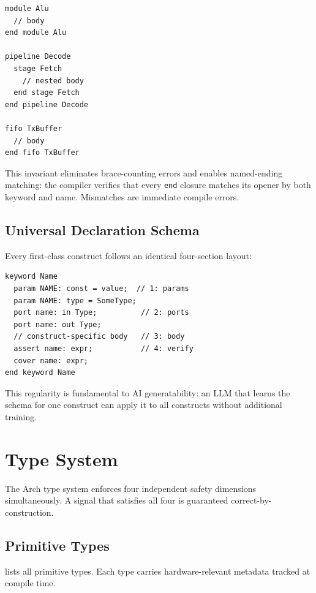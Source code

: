 \documentclass[11pt,twocolumn]{article}
\begin{document}
\begin{lstlisting}[language=Arch,caption={Universal block grammar},label={lst:block}]
module Alu
  // body
end module Alu

pipeline Decode
  stage Fetch
    // nested body
  end stage Fetch
end pipeline Decode

fifo TxBuffer
  // body
end fifo TxBuffer
\end{lstlisting}

This invariant eliminates brace-counting errors and enables named-ending matching: the compiler verifies that every \texttt{end} closure matches its opener by both keyword and name. Mismatches are immediate compile errors.

\subsection{Universal Declaration Schema}

Every first-class construct follows an identical four-section layout:

\begin{lstlisting}[language=Arch,caption={Universal schema},label={lst:schema}]
keyword Name
  param NAME: const = value;  // 1: params
  param NAME: type = SomeType;
  port name: in Type;          // 2: ports
  port name: out Type;
  // construct-specific body   // 3: body
  assert name: expr;           // 4: verify
  cover name: expr;
end keyword Name
\end{lstlisting}

This regularity is fundamental to AI generatability: an LLM that learns the schema for one construct can apply it to all constructs without additional training.

\section{Type System}\label{sec:types}

The Arch type system enforces four independent safety dimensions simultaneously. A signal that satisfies all four is guaranteed correct-by-construction.

\subsection{Primitive Types}

 lists all primitive types. Each type carries hardware-relevant metadata tracked at compile time.
\end{document}
